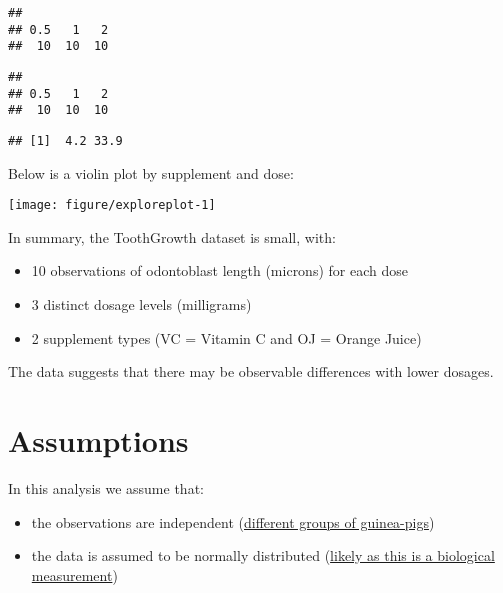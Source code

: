 \documentclass[legalpaper]{article}
\newenvironment{Shaded}{\begin{snugshade}}{\end{snugshade}}
\newcommand{\KeywordTok}[1]{\textcolor[rgb]{0.13,0.29,0.53}{\textbf{{#1}}}}
\newcommand{\StringTok}[1]{\textcolor[rgb]{0.31,0.60,0.02}{{#1}}}
\newcommand{\NormalTok}[1]{{#1}}
\begin{document}
\begin{verbatim}
## 
## 0.5   1   2 
##  10  10  10
\end{verbatim}

\begin{Shaded}
\end{Shaded}

\begin{verbatim}
## 
## 0.5   1   2 
##  10  10  10
\end{verbatim}

\begin{Shaded}
\end{Shaded}

\begin{verbatim}
## [1]  4.2 33.9
\end{verbatim}

Below is a violin plot by supplement and dose:

\begin{center}\texttt{[image: figure/exploreplot-1]} \end{center}

In summary, the ToothGrowth dataset is small, with:

\begin{itemize}
\itemsep1pt\parskip0pt
\item
  10 observations of odontoblast length (microns) for each dose
\item
  3 distinct dosage levels (milligrams)
\item
  2 supplement types (VC = Vitamin C and OJ = Orange Juice)
\end{itemize}

The data suggests that there may be observable differences with lower
dosages.

\section{Assumptions}\label{assumptions}

In this analysis we assume that:

\begin{itemize}
\itemsep1pt\parskip0pt
\item
  the observations are independent
  (\href{http://jn.nutrition.org/content/33/5/491.full.pdf}{different
  groups of guinea-pigs})
\item
  the data is assumed to be normally distributed
  (\href{https://en.wikipedia.org/wiki/Normal_distribution\#/Approximate_normality}{likely
  as this is a biological measurement})
\end{itemize}
\end{document}
